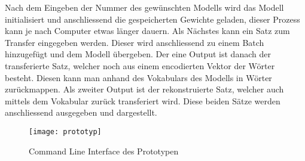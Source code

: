 \noindent
Nach dem Eingeben der Nummer des gewünschten Modells wird das Modell initialisiert und anschliessend die gespeicherten
Gewichte geladen, dieser Prozess kann je nach Computer etwas länger dauern. Als Nächstes kann ein Satz zum Transfer
eingegeben werden. Dieser wird anschliessend zu einem Batch hinzugefügt und dem Modell übergeben. Der eine Output ist
danach der transferierte Satz, welcher noch aus einem encodierten Vektor der Wörter besteht. Diesen kann man anhand des
Vokabulars des Modells in Wörter zurückmappen. Als zweiter Output ist der rekonstruierte Satz, welcher auch mittels dem
Vokabular zurück transferiert wird. Diese beiden Sätze werden anschliessend ausgegeben und dargestellt.

\begin{figure}[H]
  \centering
  \texttt{[image: prototyp]}
  \caption{Command Line Interface des Prototypen}\label{fig:prototyp}
\end{figure}
